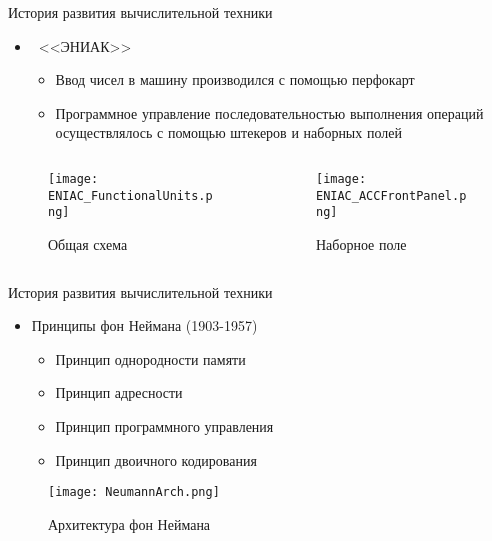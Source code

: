\documentclass[aspectratio=169,14pt]{beamer}
\begin{document}
\begin{frame}{История развития вычислительной техники}
    \begin{itemize}
        \item ~<<ЭНИАК>>
        \begin{itemize}
            \item Ввод чисел в машину производился с помощью перфокарт
            \item Программное управление последовательностью выполнения
            операций осуществлялось с помощью штекеров и наборных полей
        \end{itemize}
    \end{itemize}
    \begin{columns}[T,onlytextwidth]
        \begin{column}{0.6\textwidth}
            \begin{figure}[htp]
                \centering
                \texttt{[image: ENIAC\_FunctionalUnits.png]}
                \caption{\tiny{Общая схема}}
                \label{fig:ENIAC_FunctionalUnits}
            \end{figure}
        \end{column}
        \begin{column}{0.4\textwidth}
            \begin{figure}[htp]
                \centering
                \texttt{[image: ENIAC\_ACCFrontPanel.png]}
                \caption{\tiny{Наборное поле}}
                \label{fig:ENIAC_ACCFrontPanel}
            \end{figure}
        \end{column}
    \end{columns}
\end{frame}

\begin{frame}{История развития вычислительной техники}
    \begin{itemize}
        \item Принципы фон Неймана (1903-1957)
        \begin{itemize}
            \item Принцип однородности памяти
            \item Принцип адресности
            \item Принцип программного управления
            \item Принцип двоичного кодирования
        \end{itemize}
    \end{itemize}
    \begin{figure}[htp]
        \centering
        \texttt{[image: NeumannArch.png]}
        \caption{\scriptsize{Архитектура фон Неймана}}
        \label{fig:NeumannArch}
    \end{figure}
\end{frame}
\end{document}
